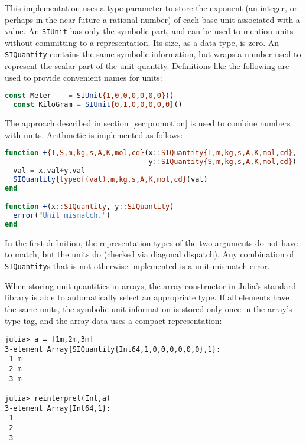 \noindent
This implementation uses a type parameter to store the exponent (an integer,
or perhaps in the near future a rational number) of each base unit associated
with a value.
An \texttt{SIUnit} has only the symbolic part, and can be used to mention
units without committing to a representation.
Its size, as a data type, is zero.
An \texttt{SIQuantity} contains the same symbolic information, but wraps a
number used to represent the scalar part of the unit quantity.
Definitions like the following are used to provide convenient names for units:

\begin{singlespace}
\begin{lstlisting}[language=julia]
  const Meter    = SIUnit{1,0,0,0,0,0,0}()
  const KiloGram = SIUnit{0,1,0,0,0,0,0}()
\end{lstlisting}
\end{singlespace}

\noindent
The approach described in section~\ref{sec:promotion} is used to combine
numbers with units.
Arithmetic is implemented as follows:

\begin{singlespace}
\begin{lstlisting}[language=julia]
function +{T,S,m,kg,s,A,K,mol,cd}(x::SIQuantity{T,m,kg,s,A,K,mol,cd},
                                  y::SIQuantity{S,m,kg,s,A,K,mol,cd})
  val = x.val+y.val
  SIQuantity{typeof(val),m,kg,s,A,K,mol,cd}(val)
end

function +(x::SIQuantity, y::SIQuantity)
  error("Unit mismatch.")
end
\end{lstlisting}
\end{singlespace}

\noindent
In the first definition, the representation types of the two
arguments do not have to match, but the units do (checked via diagonal
dispatch).
Any combination of \texttt{SIQuantity}s that is not otherwise implemented
is a unit mismatch error.

When storing unit quantities in arrays, the array constructor in Julia's
standard library is able to automatically select an appropriate type.
If all elements have the same units, the symbolic unit information is
stored only once in the array's type tag, and the array data uses a
compact representation:

\begin{singlespace}
\begin{verbatim}
julia> a = [1m,2m,3m]
3-element Array{SIQuantity{Int64,1,0,0,0,0,0,0},1}:
 1 m
 2 m
 3 m

julia> reinterpret(Int,a)
3-element Array{Int64,1}:
 1
 2
 3
\end{verbatim}
\end{singlespace}

